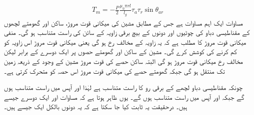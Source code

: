 \begin{align}\label{مساوات_گھومتے_مشین_مروڑ_بذریعہ_کوتوانائی_الف}
T_m=-\frac{P}{2}\frac{\mu_0 \pi r l}{l_g} \tau_a \tau_r \sin \theta_{ar}
\end{align}
مساوات  ایک اہم مساوات ہے جس کے مطابق مشین کی میکانی قوت مروڑ، ساکن اور گھومتے لچھوں کے مقناطیسی دباو کی چوٹیوں اور  دونوں کے بیچ برقی زاویہ  کے سائن کی  راست متناسب ہو گی۔ منفی میکانی قوت مروڑ کا مطلب ہے کہ یہ زاویہ   کے مخالف رخ ہو گی یعنی میکانی قوت مروڑ اس زاویہ کو کم کرنے کی کوشش کرے گی۔ مشین کے ساکن اور گھومتے حصوں پر ایک دوسرے کے  برابر لیکن مخالف رخ  میکانی قوت مروڑ ہو گی البتہ ساکن حصے کی قوت مروڑ مشین کے وجود کے ذریعہ زمین تک منتقل ہو گی جبکہ گھومتے حصے کی میکانی قوت مروڑ اس حصہ کو متحرک  کرتی  ہے۔

چونکہ مقناطیسی دباو لچھے کے  برقی رو کا راست متناسب ہے لہٰذا   اور  آپس میں  راست متناسب ہوں گے  جبکہ  اور  آپس میں  راست متناسب ہوں گے۔ یوں ظاہر ہوتا ہے کہ مساوات   اور   ایک دوسرے جیسے ہیں۔ درحقیقت یہ ثابت کیا جا سکتا ہے کہ یہ دونوں بالکل ایک جیسے  ہیں۔

